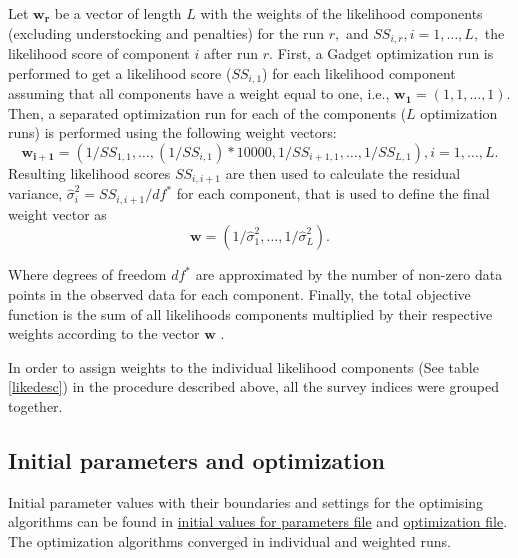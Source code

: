 \documentclass[review]{elsarticle}
\begin{document}
 
 


Let $\mathbf{w_{r}}$ be a vector of length $L$ with the weights of the likelihood components (excluding understocking and penalties) for the run $r,$ and $SS_{i,r}, i=1,\dots,L,$ the likelihood score of component $i$ after run $r.$  First, a Gadget optimization run is performed  to get a likelihood score ($SS_{i,1}$) for each likelihood component assuming that all components have a weight equal to one, i.e., $\mathbf{w_{1}}=(1,1,\dots, 1).$  Then, a separated optimization run for each of the components ($L$ optimization runs) is performed  using  the following weight vectors:
$$\mathbf{w_{i+1}}=(1/SS_{1,1},\dots, (1/SS_{i,1})*10000,1/SS_{i+1,1},\dots,1/SS_{L,1}), i=1, \dots,L.$$
Resulting likelihood scores $SS_{i,i+1}$ are then used to calculate the residual variance, $\hat{\sigma}_{i}^{2}=SS_{i,i+1}/df^*$ for each component, that is used to define the final weight vector as $$\mathbf{w}=(1/\hat{\sigma}_{1}^{2},\dots, 1/\hat{\sigma}_{L}^{2}).$$

Where degrees of freedom $df^*$ are approximated by the number of non-zero data points in the observed data for each component.
Finally, the total objective function is the sum of all likelihoods components multiplied by their respective weights according to the vector $\mathbf{w}$ .

In order to assign weights to the individual likelihood components (See table \ref{likedesc}) in the procedure described above, all the survey indices were grouped together.

\subsection{Initial parameters and optimization}
Initial parameter values with their boundaries and settings for the optimising
algorithms can be found in \href{https://github.com/mmrinconh/recovery-results-2020/blob/main/Anchovy2022_def_estesi_4run_shortopt/params.in}{initial values for parameters file} and \href{https://github.com/mmrinconh/recovery-results-2020/blob/main/Anchovy2022_def_estesi_4run_shortopt/optfile}{optimization file}. The optimization algorithms converged in individual and weighted runs.
\end{document}
